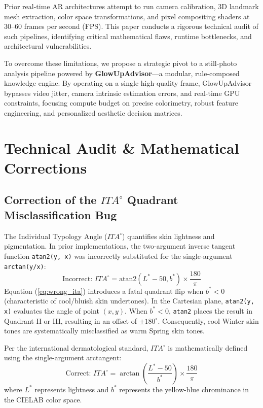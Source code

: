 \documentclass[conference]{IEEEtran}
\begin{document}
Prior real-time AR architectures attempt to run camera calibration, 3D landmark mesh extraction, color space transformations, and pixel compositing shaders at 30--60 frames per second (FPS). This paper conducts a rigorous technical audit of such pipelines, identifying critical mathematical flaws, runtime bottlenecks, and architectural vulnerabilities. 

To overcome these limitations, we propose a strategic pivot to a still-photo analysis pipeline powered by \textbf{GlowUpAdvisor}—a modular, rule-composed knowledge engine. By operating on a single high-quality frame, GlowUpAdvisor bypasses video jitter, camera intrinsic estimation errors, and real-time GPU constraints, focusing compute budget on precise colorimetry, robust feature engineering, and personalized aesthetic decision matrices.

\section{Technical Audit \& Mathematical Corrections}

\subsection{Correction of the $ITA^\circ$ Quadrant Misclassification Bug}
The Individual Typology Angle ($ITA^\circ$) quantifies skin lightness and pigmentation. In prior implementations, the two-argument inverse tangent function \texttt{atan2(y, x)} was incorrectly substituted for the single-argument \texttt{arctan(y/x)}:
\begin{equation}
\text{Incorrect: } ITA^\circ = \text{atan2}(L^* - 50, b^*) \times \frac{180}{\pi}
\label{eq:wrong_ita}
\end{equation}
Equation (\ref{eq:wrong_ita}) introduces a fatal quadrant flip when $b^* < 0$ (characteristic of cool/bluish skin undertones). In the Cartesian plane, \texttt{atan2(y, x)} evaluates the angle of point $(x, y)$. When $b^* < 0$, \texttt{atan2} places the result in Quadrant II or III, resulting in an offset of $\pm 180^\circ$. Consequently, cool Winter skin tones are systematically misclassified as warm Spring skin tones.

Per the international dermatological standard, $ITA^\circ$ is mathematically defined using the single-argument arctangent:
\begin{equation}
\text{Correct: } ITA^\circ = \arctan\left( \frac{L^* - 50}{b^*} \right) \times \frac{180}{\pi}
\label{eq:correct_ita}
\end{equation}
where $L^*$ represents lightness and $b^*$ represents the yellow-blue chrominance in the CIELAB color space.
\end{document}
